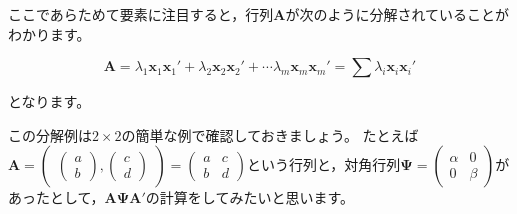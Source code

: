 \documentclass{ltjsbook}
\begin{document}
ここであらためて要素に注目すると，行列$\bm{A}$が次のように分解されていることがわかります。

\[
	\bm{A}= \lambda_1 \bm{x}_1 \bm{x}_1' + \lambda_2 \bm{x}_2 \bm{x}_2' + \cdots \lambda_m \bm{x}_m \bm{x}_m'= \sum \lambda_{i} \bm{x}_{i} \bm{x}_i'
\]

となります。

この分解例は$2 \times 2$の簡単な例で確認しておきましょう。
たとえば$\bm{A} = \begin{pmatrix}\begin{pmatrix}a\\b\end{pmatrix},\begin{pmatrix}c\\d\end{pmatrix}\end{pmatrix}=\begin{pmatrix} a & c \\b & d\end{pmatrix}$という行列と，対角行列$\bm{\Psi} = \begin{pmatrix}\alpha & 0 \\ 0 & \beta \end{pmatrix}$があったとして，$\bm{A\Psi A}'$の計算をしてみたいと思います。
\end{document}
